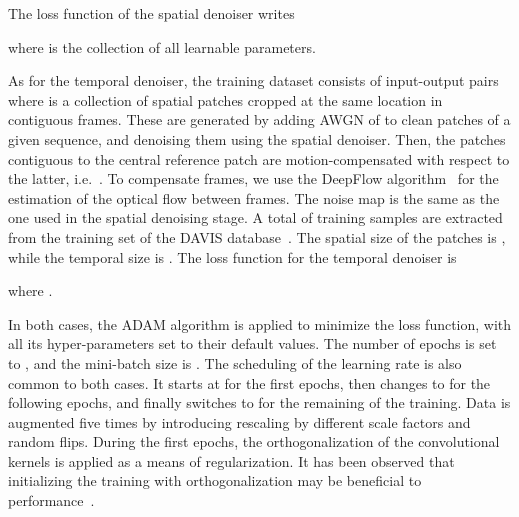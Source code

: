 \documentclass{article}
\begin{document}
The loss function of the spatial denoiser writes

where  is the collection of all learnable parameters.
	
	As for the temporal denoiser, the training dataset consists of input-output pairs  where  is a collection of  spatial patches cropped at the same location in contiguous frames. These are generated by adding AWGN of  to clean patches of a given sequence, and denoising them using the spatial denoiser. Then, the  patches contiguous to the central reference patch  are motion-compensated with respect to the latter, i.e.\ . To compensate frames, we use the DeepFlow algorithm~\cite{weinzaepfel:hal-00873592} for the estimation of the optical flow between frames. The noise map  is the same as the one used in the spatial denoising stage. A total of  training samples are extracted from the training set of the DAVIS database~\cite{KhoRohrSch_ACCV2018}. The spatial size of the patches is , while the temporal size is . The loss function for the temporal denoiser is

where .
	
	In both cases, the ADAM algorithm \cite{Kingma2015} is applied to minimize the loss function, with all its hyper-parameters set to their default values. The number of epochs is set to , and the mini-batch size is . The scheduling of the learning rate is also common to both cases. It starts at  for the first  epochs, then changes to  for the following  epochs, and finally switches to  for the remaining of the training. Data is augmented five times by introducing rescaling by different scale factors and random flips. During the first  epochs, the orthogonalization of the convolutional kernels is applied as a means of regularization. It has been observed that initializing the training with orthogonalization may be beneficial to performance~\cite{Zhang2017a,ipol.2019.231}.
\end{document}
